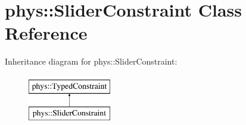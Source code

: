 \hypertarget{classphys_1_1SliderConstraint}{
\section{phys::SliderConstraint Class Reference}
\label{dc/d72/classphys_1_1SliderConstraint}
}
Inheritance diagram for phys::SliderConstraint:\begin{figure}[H]
\begin{center}
\leavevmode
\includegraphics[height=2.000000cm]{dc/d72/classphys_1_1SliderConstraint}
\end{center}
\end{figure}
